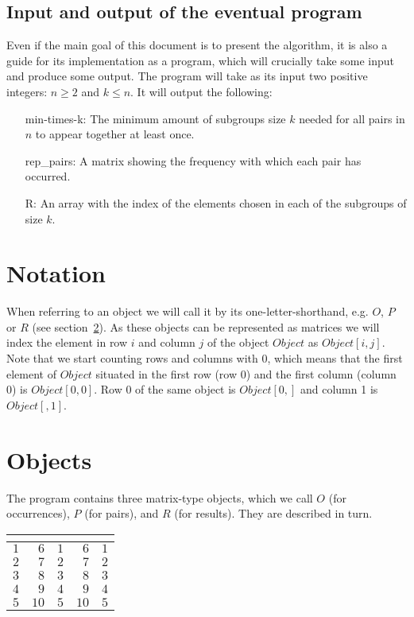 \documentclass[a4paper]{article}
\begin{document}
\subsection{Input and output of the eventual program}

Even if the main goal of this document is to present the algorithm, it is also a guide for its implementation as a program, which will crucially take some input and produce some output.
The program will take as its input two positive integers: $ n \geq 2$ and $k \leq n$.
It will output the following:

\begin{itemize}
\item[min-times-k:]
The minimum amount of subgroups size $k$ needed for all pairs in $n$ to appear together at least once.
\item[rep\_pairs:]
A matrix showing the frequency with which each pair has occurred.
\item[R:] 
An array with the index of the elements chosen in each of the subgroups of size $k$.
\end{itemize}

\section{Notation}

When referring to an object we will call it by its one-letter-shorthand, e.g. $O$, $P$ or $R$ (see section~\ref{sec:objects}).
As these objects can be represented as matrices we will index the element in row $i$ and column $j$ of the object $Object$ as $Object[i,j]$.
Note that we start counting rows and columns with $0$,
which means that the first element of $Object$ situated in the first row (row 0) and the first column (column 0) is $Object[0,0]$.
Row 0 of the same object is $Object[0,]$ and column 1 is $Object[,1]$.

\section{Objects}
\label{sec:objects}

The program contains three matrix-type objects, which we call $O$ (for occurrences),
$P$ (for pairs), 
and $R$ (for results).
They are described in turn.

\begin{table}[!tbp]
\begin{center}
\begin{tabular}{rrrrr}
\hline\hline
\multicolumn{1}{c}{}&\multicolumn{1}{c}{}&\multicolumn{1}{c}{}&\multicolumn{1}{c}{}&\multicolumn{1}{c}{}\tabularnewline
\hline
$1$&$ 6$&$1$&$ 6$&$1$\tabularnewline
$2$&$ 7$&$2$&$ 7$&$2$\tabularnewline
$3$&$ 8$&$3$&$ 8$&$3$\tabularnewline
$4$&$ 9$&$4$&$ 9$&$4$\tabularnewline
$5$&$10$&$5$&$10$&$5$\tabularnewline
\hline
\end{tabular}
\end{center}
\end{table}
\end{document}
